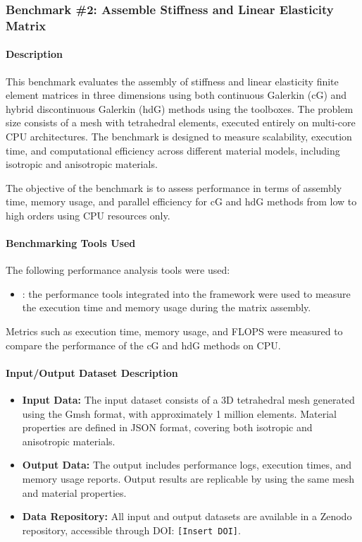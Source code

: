 \subsubsection{Benchmark \#2: Assemble Stiffness and Linear Elasticity Matrix}

\paragraph{Description}
This benchmark evaluates the assembly of stiffness and linear elasticity finite element matrices in three dimensions using both continuous Galerkin (cG) and hybrid discontinuous Galerkin (hdG) methods using the \Feelpp toolboxes.
The problem size consists of a mesh with tetrahedral elements, executed entirely on multi-core CPU architectures.
The benchmark is designed to measure scalability, execution time, and computational efficiency across different material models, including isotropic and anisotropic materials.

The objective of the benchmark is to assess performance in terms of assembly time, memory usage, and parallel efficiency for cG and hdG methods from low to high orders using CPU resources only.

\paragraph{Benchmarking Tools Used}
The following performance analysis tools were used:
\begin{itemize}
    \item \textbf{\Feelpp}: the performance tools integrated into the \Feelpp framework were used to measure the execution time and memory usage during the matrix assembly.
\end{itemize}

Metrics such as execution time, memory usage, and FLOPS were measured to compare the performance of the cG and hdG methods on CPU.

\paragraph{Input/Output Dataset Description}
\begin{itemize}
    \item \textbf{Input Data:} The input dataset consists of a 3D tetrahedral mesh generated using the Gmsh format, with approximately 1 million elements. Material properties are defined in JSON format, covering both isotropic and anisotropic materials.

    \item \textbf{Output Data:} The output includes performance logs, execution times, and memory usage reports. Output results are replicable by using the same mesh and material properties.

    \item \textbf{Data Repository:} All input and output datasets are available in a Zenodo repository, accessible through DOI: \texttt{[Insert DOI]}.
\end{itemize}

